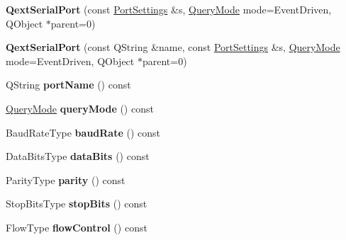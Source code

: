 \begin{DoxyCompactItemize}
\item 
\mbox{\label{class_qext_serial_port_a990ab7ac41bbfe2e9ec2e247145bd49e}} 
{\bfseries Qext\+Serial\+Port} (const \mbox{\hyperlink{struct_port_settings}{Port\+Settings}} \&s, \mbox{\hyperlink{class_qext_serial_port_a269e1f3656224a10c321bd70ab89cf64}{Query\+Mode}} mode=Event\+Driven, Q\+Object $\ast$parent=0)
\item 
\mbox{\label{class_qext_serial_port_a31c6182fc721b775231c5cc4b1ab98de}} 
{\bfseries Qext\+Serial\+Port} (const Q\+String \&name, const \mbox{\hyperlink{struct_port_settings}{Port\+Settings}} \&s, \mbox{\hyperlink{class_qext_serial_port_a269e1f3656224a10c321bd70ab89cf64}{Query\+Mode}} mode=Event\+Driven, Q\+Object $\ast$parent=0)
\item 
\mbox{\label{class_qext_serial_port_a4e2de47edc32d7e5c6827c55534e23da}} 
Q\+String {\bfseries port\+Name} () const
\item 
\mbox{\label{class_qext_serial_port_a2a89b9bd0be1a9e0f817acd77f11842f}} 
\mbox{\hyperlink{class_qext_serial_port_a269e1f3656224a10c321bd70ab89cf64}{Query\+Mode}} {\bfseries query\+Mode} () const
\item 
\mbox{\label{class_qext_serial_port_aca6d359f346c3938ee13fef282fc4844}} 
Baud\+Rate\+Type {\bfseries baud\+Rate} () const
\item 
\mbox{\label{class_qext_serial_port_a8f1822355b63a38924d4f3c9e8b6ae8a}} 
Data\+Bits\+Type {\bfseries data\+Bits} () const
\item 
\mbox{\label{class_qext_serial_port_adc80d1c0705ed88b6472883937ad3c20}} 
Parity\+Type {\bfseries parity} () const
\item 
\mbox{\label{class_qext_serial_port_ac555d2bc67a6f1a4f389c54f3a3d5f60}} 
Stop\+Bits\+Type {\bfseries stop\+Bits} () const
\item 
\mbox{\label{class_qext_serial_port_a54adc33c948296a4fdfae02bca62a8a9}} 
Flow\+Type {\bfseries flow\+Control} () const

\end{DoxyCompactItemize}
